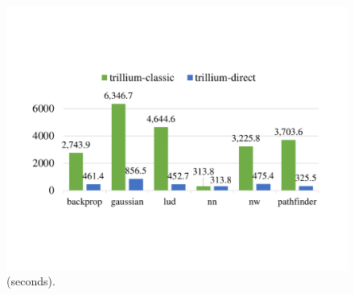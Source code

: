 \begin{figure}[!ht]
	\centering
	\includegraphics[width=\linewidth,trim={2cm 5cm 2cm 5.5cm},clip]{data/trillium/clover.pdf}
	\caption{{\footnotesize {} (seconds). }}
	\label{fig_clover_overhead} \end{figure}

